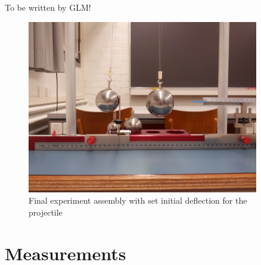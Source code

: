 \documentclass{scrreprt}
\begin{document}
To be written by GLM!

\begin{figure}[H]
	\centering
  \includegraphics[width=0.9\textwidth]{img/assembly.jpg}
	\caption{Final experiment assembly with set initial deflection for the projectile}
	\label{fig:assembly}
\end{figure}

\section{Measurements}
\end{document}
